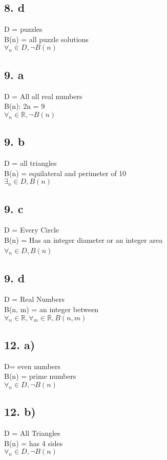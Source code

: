 \documentclass[12]{scrartcl}
\begin{document}
\subsection*{8. d}
D = puzzles \\
B(n) = all puzzle solutions\\
$\forall_n \in D, \neg B(n)$

\subsection*{9. a}
D = All all real numbers \\
B(n): 2n = 9\\
$\forall_n \in \mathds{R}, \neg B(n)$

\subsection*{9. b}
D = all triangles\\
B(n) = equilateral and perimeter of 10\\
$\exists_n \in D, B(n)$

\subsection*{9. c}
D = Every Circle\\
B(n) = Has an integer diameter or an integer area\\
$\forall_n \in D, B(n)$\

\subsection*{9. d}
D = Real Numbers\\
B(n, m) = an integer between\\
$\forall_n \in \mathds{R}, \forall_m  \in \mathds{R}, B(n, m )$

\subsection*{12. a)}
D= even numbers\\
B(n) = prime numbers\\
$\forall_n \in D, \neg B(n)$

\subsection*{12. b)}
D = All Triangles\\
B(n) = has 4 sides\\
$\forall_n \in D, \neg B(n)$
\end{document}
